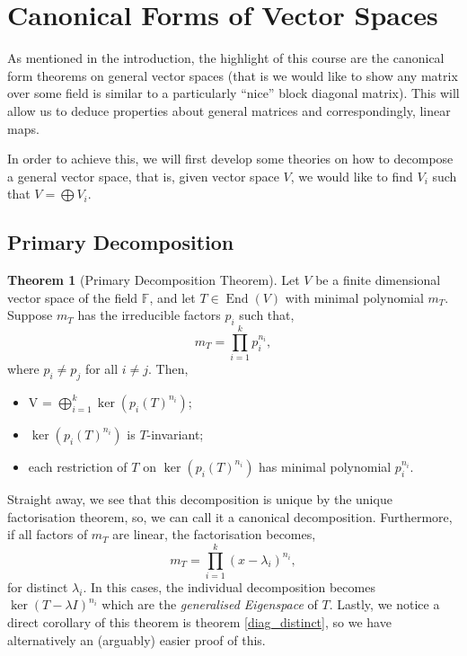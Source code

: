 \documentclass[
]{article}
\theoremstyle{definition}
\newtheorem{theorem}{Theorem}
\theoremstyle{definition}
\begin{document}
\newpage

\hypertarget{canonical-forms-of-vector-spaces}{%
\section{Canonical Forms of Vector
Spaces}\label{canonical-forms-of-vector-spaces}}

As mentioned in the introduction, the highlight of this course are the
canonical form theorems on general vector spaces (that is we would like
to show any matrix over some field is similar to a particularly ``nice''
block diagonal matrix). This will allow us to deduce properties about
general matrices and correspondingly, linear maps.

In order to achieve this, we will first develop some theories on how to
decompose a general vector space, that is, given vector space \(V\), we
would like to find \(V_i\) such that \(V = \bigoplus V_i\).

\hypertarget{primary-decomposition}{%
\subsection{Primary Decomposition}\label{primary-decomposition}}

\begin{theorem}[Primary Decomposition Theorem]
  Let \(V\) be a finite dimensional vector space of the field \(\mathbb{F}\), and 
  let \(T \in \mathop{\mathrm{End}}(V)\) with minimal polynomial \(m_T\). Suppose \(m_T\) has 
  the irreducible factors \(p_i\) such that,
  \[m_T = \prod_{i = 1}^k p_i^{n_i},\]
  where \(p_i \neq p_j\) for all \(i \neq j\). Then, 
  \begin{itemize}
    \item V = \(\bigoplus_{i = 1}^k \ker(p_i(T)^{n_i})\);
    \item \(\ker(p_i(T)^{n_i})\) is \(T\)-invariant;
    \item each restriction of \(T\) on \(\ker(p_i(T)^{n_i})\) has minimal polynomial 
      \(p_i^{n_i}\).
  \end{itemize}
\end{theorem}

Straight away, we see that this decomposition is unique by the unique
factorisation theorem, so, we can call it a canonical decomposition.
Furthermore, if all factors of \(m_T\) are linear, the factorisation
becomes, \[m_T = \prod_{i = 1}^k (x - \lambda_i)^{n_i},\] for distinct
\(\lambda_i\). In this cases, the individual decomposition becomes
\(\ker (T - \lambda I)^{n_i}\) which are the \emph{generalised
Eigenspace} of \(T\). Lastly, we notice a direct corollary of this
theorem is theorem \ref{diag_distinct}, so we have alternatively an
(arguably) easier proof of this.
\end{document}
